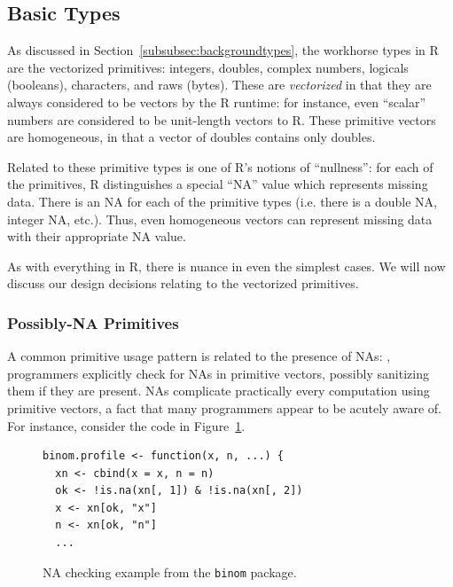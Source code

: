 \documentclass[acmsmall,review,anonymous]{acmart}\settopmatter{printfolios=true,printccs=false,printacmref=false}
\newcommand{\code}[1]{{\lstinline[style=Rin]!#1!}\xspace}
\begin{document}
%
%
%
%
\subsection{Basic Types}
\label{subsec:basictypes}

As discussed in Section~\ref{subsubsec:backgroundtypes}, the workhorse types
in R are the vectorized primitives: integers, doubles, complex numbers,
logicals (booleans), characters, and raws (bytes).  These are {\it
  vectorized} in that they are always considered to be vectors by the R
runtime: for instance, even ``scalar'' numbers are considered to be
unit-length vectors to R.  These primitive vectors are homogeneous, in that
a vector of doubles contains only doubles.

Related to these primitive types is one of R's notions of ``nullness'': for
each of the primitives, R distinguishes a special ``NA'' value which
represents missing data.  There is an NA for each of the primitive types
(i.e. there is a double NA, integer NA, etc.).  Thus, even homogeneous
vectors can represent missing data with their appropriate NA value.

As with everything in R, there is nuance in even the simplest cases.
We will now discuss our design decisions relating to the vectorized primitives.

%
%
\subsubsection{Possibly-NA Primitives}

A common primitive usage pattern is related to the presence of NAs:
, programmers explicitly check for NAs in primitive vectors,
possibly sanitizing them if they are present.  NAs complicate practically every computation
using primitive vectors, a fact that many programmers appear to be acutely
aware of. For instance, consider the code in Figure~\ref{fig:na-example}.

\begin{figure}[htbp]
\begin{center}

\begin{lstlisting}
binom.profile <- function(x, n, ...) {
  xn <- cbind(x = x, n = n)
  ok <- !is.na(xn[, 1]) & !is.na(xn[, 2])
  x <- xn[ok, "x"]
  n <- xn[ok, "n"]
  ...
\end{lstlisting}

\caption{NA checking example from the \code{binom} package.}
\label{fig:na-example}
\end{center}
\end{figure}
\end{document}
